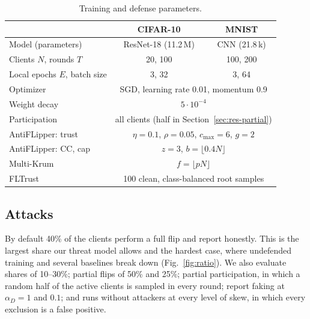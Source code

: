 \documentclass[journal]{IEEEtran}
\begin{document}
\begin{table}[t]
\centering
\caption{Training and defense parameters.}
\label{tab:hyper}
\footnotesize
\setlength{\tabcolsep}{4pt}
\begin{tabular}{@{}lcc@{}}
\toprule
& \textbf{CIFAR-10} & \textbf{MNIST} \\
\midrule
Model (parameters) & ResNet-18 (11.2\,M) & CNN (21.8\,k) \\
Clients $N$, rounds $T$ & 20, 100 & 100, 200 \\
Local epochs $E$, batch size & 3, 32 & 3, 64 \\
Optimizer & \multicolumn{2}{c}{SGD, learning rate 0.01, momentum 0.9} \\
Weight decay & \multicolumn{2}{c}{$5\cdot10^{-4}$} \\
Participation & \multicolumn{2}{c}{all clients (half in Section~\ref{sec:res-partial})} \\
\midrule
AntiFLipper: trust & \multicolumn{2}{c}{$\eta{=}0.1$, $\rho{=}0.05$, $c_{\max}{=}6$, $g{=}2$} \\
AntiFLipper: CC, cap & \multicolumn{2}{c}{$z{=}3$, $b{=}\lfloor0.4N\rfloor$} \\
Multi-Krum & \multicolumn{2}{c}{$f=\lfloor pN\rfloor$} \\
FLTrust & \multicolumn{2}{c}{100 clean, class-balanced root samples} \\
\bottomrule
\end{tabular}
\end{table}

\subsection{Attacks}
By default 40\% of the clients perform a full flip and report honestly. This is the largest share our threat model allows and the hardest case, where undefended training and several baselines break down (Fig.~\ref{fig:ratio}). We also evaluate shares of 10--30\%; partial flips of 50\% and 25\%; partial participation, in which a random half of the active clients is sampled in every round; report faking at $\alpha_D{=}1$ and $0.1$; and runs without attackers at every level of skew, in which every exclusion is a false positive.
\end{document}
